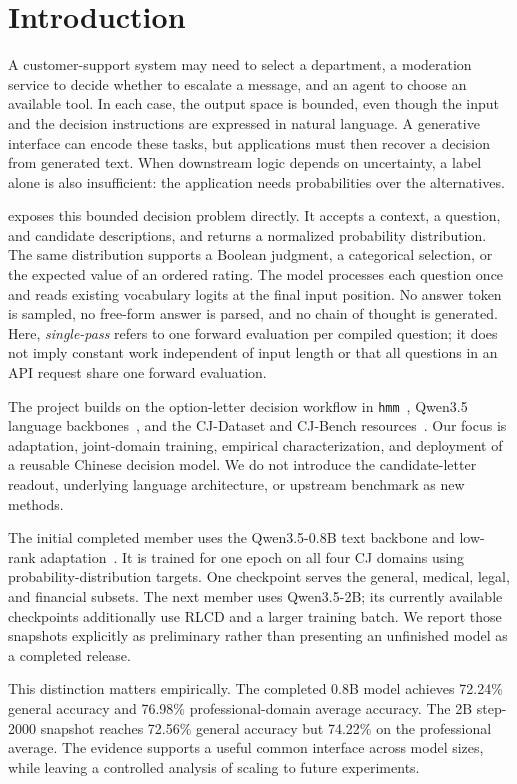 \section{Introduction}
\label{sec:intro}
A customer-support system may need to select a department, a moderation service to decide whether to escalate a message, and an agent to choose an available tool. In each case, the output space is bounded, even though the input and the decision instructions are expressed in natural language. A generative interface can encode these tasks, but applications must then recover a decision from generated text. When downstream logic depends on uncertainty, a label alone is also insufficient: the application needs probabilities over the alternatives.

\model{} exposes this bounded decision problem directly. It accepts a context, a question, and candidate descriptions, and returns a normalized probability distribution. The same distribution supports a Boolean judgment, a categorical selection, or the expected value of an ordered rating. The model processes each question once and reads existing vocabulary logits at the final input position. No answer token is sampled, no free-form answer is parsed, and no chain of thought is generated. Here, \emph{single-pass} refers to one forward evaluation per compiled question; it does not imply constant work independent of input length or that all questions in an API request share one forward evaluation.

The project builds on the option-letter decision workflow in \texttt{hmm}~\citep{hmm2026}, Qwen3.5 language backbones~\citep{qwen08,qwen2b}, and the CJ-Dataset and CJ-Bench resources~\citep{wang2026chinesejev}. Our focus is adaptation, joint-domain training, empirical characterization, and deployment of a reusable Chinese decision model. We do not introduce the candidate-letter readout, underlying language architecture, or upstream benchmark as new methods.

The initial completed member uses the Qwen3.5-0.8B text backbone and low-rank adaptation~\citep{hu2021lora}. It is trained for one epoch on all four CJ domains using probability-distribution targets. One checkpoint serves the general, medical, legal, and financial subsets. The next member uses Qwen3.5-2B; its currently available checkpoints additionally use RLCD and a larger training batch. We report those snapshots explicitly as preliminary rather than presenting an unfinished model as a completed release.

This distinction matters empirically. The completed 0.8B model achieves 72.24\% general accuracy and 76.98\% professional-domain average accuracy. The 2B step-2000 snapshot reaches 72.56\% general accuracy but 74.22\% on the professional average. The evidence supports a useful common interface across model sizes, while leaving a controlled analysis of scaling to future experiments.

